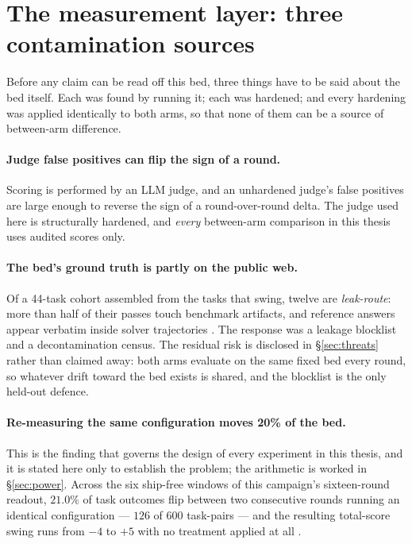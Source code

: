 \section{The measurement layer: three contamination sources}
\label{sec:measurement}

Before any claim can be read off this bed, three things have to be said
about the bed itself. Each was found by running it; each was hardened; and
every hardening was applied identically to both arms, so that none of them
can be a source of between-arm difference.

\paragraph{Judge false positives can flip the sign of a round.} Scoring is
performed by an LLM judge, and an unhardened judge's false positives are
large enough to reverse the sign of a round-over-round delta. The judge
used here is structurally hardened, and \emph{every} between-arm comparison
in this thesis uses audited scores only.

\paragraph{The bed's ground truth is partly on the public web.} Of a
44-task cohort assembled from the tasks that swing, twelve are
\emph{leak-route}: more than half of their passes touch benchmark
artifacts, and reference answers appear verbatim inside solver
trajectories . The response was a leakage blocklist and a
decontamination census. The residual risk is disclosed in
\S\ref{sec:threats} rather than claimed away: both arms evaluate on the
same fixed bed every round, so whatever drift toward the bed exists is
shared, and the blocklist is the only held-out defence.

\paragraph{Re-measuring the same configuration moves 20\% of the bed.}
This is the finding that governs the design of every experiment in this
thesis, and it is stated here only to establish the problem; the arithmetic
is worked in \S\ref{sec:power}. Across the six ship-free windows of this
campaign's sixteen-round readout, $21.0\%$ of task outcomes flip between
two consecutive rounds running an identical configuration --- $126$ of
$600$ task-pairs --- and the resulting total-score swing runs from $-4$ to
$+5$ with no treatment applied at all .


